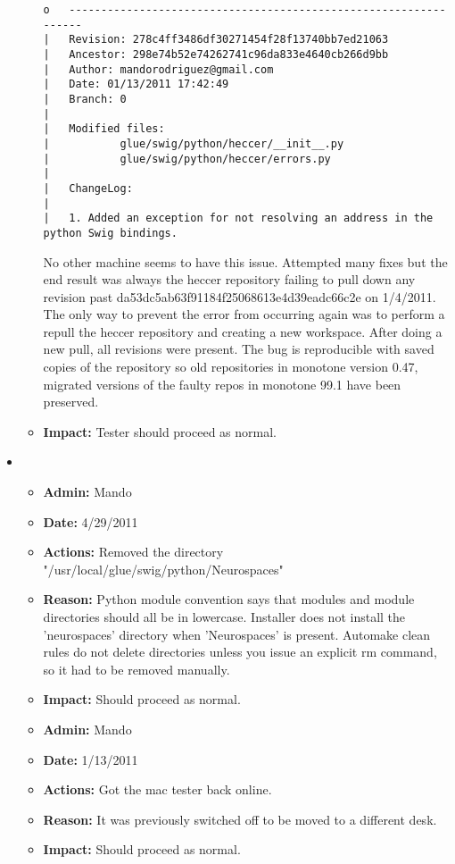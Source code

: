 \documentclass[12pt]{article}
\begin{document}
\begin{itemize}
\begin{itemize}
\begin{verbatim}
o   -----------------------------------------------------------------
|   Revision: 278c4ff3486df30271454f28f13740bb7ed21063
|   Ancestor: 298e74b52e74262741c96da833e4640cb266d9bb
|   Author: mandorodriguez@gmail.com
|   Date: 01/13/2011 17:42:49
|   Branch: 0
|   
|   Modified files:
|           glue/swig/python/heccer/__init__.py
|           glue/swig/python/heccer/errors.py
|   
|   ChangeLog: 
|   
|   1. Added an exception for not resolving an address in the python Swig bindings.
\end{verbatim}

No other machine seems to have this issue. Attempted many fixes but the end result was always the heccer repository failing to pull down any revision past da53dc5ab63f91184f25068613e4d39eadc66c2e on 1/4/2011.  The only way to prevent the error from occurring again was to perform a repull the heccer repository and creating a new workspace. After doing a new pull, all revisions were present. The bug is reproducible with saved copies of the repository so old repositories in monotone version 0.47, migrated versions of the faulty repos in monotone 99.1 have been preserved.

\item[] {\bf Impact:}  Tester should proceed as normal.
\end{itemize}

\item 

\begin{itemize}
\item[] {\bf Admin:} Mando
\item[] {\bf Date:} 4/29/2011
\item[] {\bf Actions:} Removed the directory "/usr/local/glue/swig/python/Neurospaces" 
\item[] {\bf Reason:}  Python module convention says that modules and module directories should all be in lowercase. Installer does not install the 'neurospaces' directory when
'Neurospaces' is present. Automake clean rules do not delete directories unless you issue an explicit rm command, so it had to be removed manually. 
\item[] {\bf Impact:}  Should proceed as normal.
\end{itemize}

\begin{itemize}
\item[] {\bf Admin:} Mando
\item[] {\bf Date:} 1/13/2011
\item[] {\bf Actions:} Got the mac tester back online.
\item[] {\bf Reason:}  It was previously switched off to be moved to a different desk.
\item[] {\bf Impact:}  Should proceed as normal.
\end{itemize}


\end{itemize}
\end{document}
